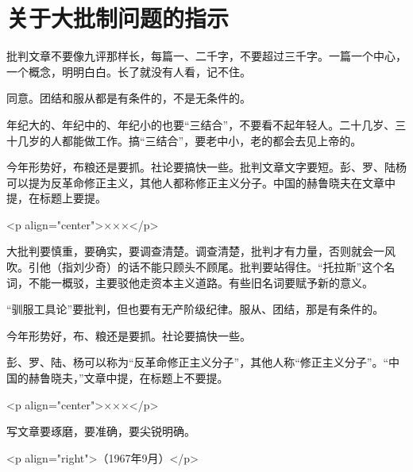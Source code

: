 \section[关于大批制问题的指示（一九六七年五月二日）]{关于大批制问题的指示}


批判文章不要像九评那样长，每篇一、二千字，不要超过三千字。一篇一个中心，一个概念，明明白白。长了就没有人看，记不住。

同意。团结和服从都是有条件的，不是无条件的。

年纪大的、年纪中的、年纪小的也要“三结合”，不要看不起年轻人。二十几岁、三十几岁的人都能做工作。搞“三结合”，要老中小，老的都会去见上帝的。

今年形势好，布粮还是要抓。社论要搞快一些。批判文章文字要短。彭、罗、陆杨可以提为反革命修正主义，其他人都称修正主义分子。中国的赫鲁晓夫在文章中提，在标题上要提。

<p align="center">×××</p>

大批判要慎重，要确实，要调查清楚。调查清楚，批判才有力量，否则就会一风吹。引他（指刘少奇）的话不能只顾头不顾尾。批判要站得住。“托拉斯”这个名词，不能一概驳，主要驳他走资本主义道路。有些旧名词要赋予新的意义。

“驯服工具论”要批判，但也要有无产阶级纪律。服从、团结，那是有条件的。

今年形势好，布、粮还是要抓。社论要搞快一些。

彭、罗、陆、杨可以称为“反革命修正主义分子”，其他人称“修正主义分子”。“中国的赫鲁晓夫，”文章中提，在标题上不要提。

<p align="center">×××</p>

写文章要琢磨，要准确，要尖锐明确。

<p align="right">（1967年9月）</p>


